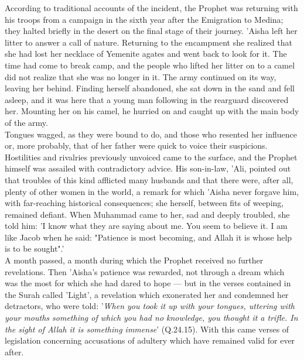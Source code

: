 \documentclass[11pt, b5paper, twoside]{book}
\begin{document}
According to traditional accounts of the incident, the Prophet was returning with his troops from a 
campaign in the sixth year after the Emigration to Medina; they halted briefly in the desert on the 
final stage of their journey. 'Aisha left her litter to answer a call of nature. Returning to the 
encampment she realized that she had lost her necklace of Yemenite agates and went back to look for 
it. The time had come to break camp, and the people who lifted her litter on to a camel did not 
realize that she was no longer in it. The army continued on its way, leaving her behind. Finding 
herself abandoned, she sat down in the sand and fell asleep, and it was here that a young man 
following in the rearguard discovered her. Mounting her on his camel, he hurried on and caught up 
with the main body of the army. \\

Tongues wagged, as they were bound to do, and those who resented her influence or, more probably, 
that of her father were quick to voice their suspicions. Hostilities and rivalries previously 
unvoiced came to the surface, and the Prophet himself was assailed with contradictory advice. His 
son-in-law, 'Ali, pointed out that troubles of this kind afflicted many husbands and that there were, 
after all, plenty of other women in the world, a remark for which 'Aisha never forgave him, with 
far-reaching historical consequences; she herself, between fits of weeping, remained defiant. When 
Muhammad came to her, sad and deeply troubled, she told him: 'I know what they are saying about me. 
You seem to believe it. I am like Jacob when he said: "Patience is most becoming, and Allah it is 
whose help is to be sought".' \\

A month passed, a month during which the Prophet received no further revelations. Then 'Aisha's 
patience was rewarded, not through a dream which was the most for which she had dared to hope --- but 
in the verses contained in the Surah called 'Light', a revelation which exonerated her and condemned 
her detractors, who were told: '\emph{When you took it up with your tongues, uttering with your mouths 
something of which you had no knowledge, you thought it a trifle. In the sight of Allah it is 
something immense}' (Q.24.15). With this came verses of legislation concerning accusations of adultery 
which have remained valid for ever after. \\
\end{document}
